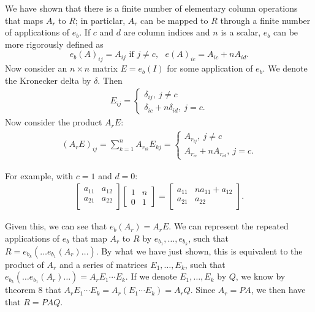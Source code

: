 \documentclass[12pt]{article}
\begin{document}
\begin{enumerate}
    We have shown that there is a finite number of elementary
    column operations that maps $A_r$ to $R$; in particlar, $A_r$
    can be mapped to $R$ through a finite number of applications
    of $e_b$. If $c$ and $d$ are column indices and $n$ is a
    scalar, $e_b$ can be more rigorously defined as
    \begin{equation*}
      e_b(A)_{ij} = A_{ij} \text{ if } j \neq c,\text{ }e(A)_{ic} =
      A_{ic} + nA_{id}.
    \end{equation*}
    Now consider an $n \times n$ matrix $E = e_b(I)$ for some
    application of $e_b$. We denote the Kronecker delta by
    $\delta$. Then
    \begin{align*}
      E_{ij} =
      \begin{cases}
        \delta_{ij},\ j \neq c\\
        \delta_{ic} + n\delta_{id},\ j = c.
      \end{cases}
    \end{align*}
    Now consider the product $A_rE$:
    \begin{align*}
      (A_rE)_{ij} = \sum_{k = 1}^{n}A_{r_{ik}}E_{kj} =
      \begin{cases}
        A_{r_{ij}},\ j \neq c\\
        A_{r_{ic}} + nA_{r_{id}},\ j = c.
      \end{cases}
    \end{align*}

    For example, with $c = 1$ and $d = 0$:
    \begin{align*}
      \begin{bmatrix}
        a_{11} & a_{12}\\
        a_{21} & a_{22}\\
      \end{bmatrix}
      \begin{bmatrix}
        1 & n\\
        0 & 1
      \end{bmatrix}
      =
      \begin{bmatrix}
        a_{11} & na_{11} + a_{12}\\
        a_{21} & a_{22}\\
      \end{bmatrix}.
    \end{align*}

    Given this, we can see that $e_b(A_r) = A_rE$. We can
    represent the repeated applications of $e_b$ that map $A_r$
    to $R$ by $e_{b_1},\ldots,e_{b_k}$, such that $R =
    e_{b_k}(\ldots e_{b_1}(A_r)\ldots)$. By what we have just
    shown, this is equivalent to the product of $A_r$ and a
    series of matrices $E_1,\ldots,E_k$, such that
    $e_{b_k}(\ldots e_{b_1}(A_r)\ldots) = A_rE_1\cdots E_k$. If
    we denote $E_1,\ldots,E_k$ by $Q$, we know by theorem 8 that
    $A_rE_1\cdots E_k = A_r(E_1\cdots E_k) = A_rQ$. Since $A_r =
    PA$, we then have that $R = PAQ$.

\end{enumerate}
\end{document}
